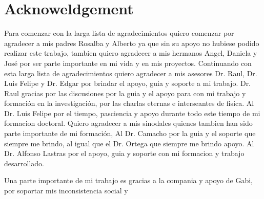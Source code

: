 \chapter*{Acknoweldgement}%

Para comenzar con la larga lista de agradecimientos quiero comenzar por agradecer a mis padres Rosalba y Alberto ya que sin su apoyo no hubiese podido realizar este trabajo, tambien quiero agradecer a mis hermanos Angel, Daniela y Jos\'e por ser parte importante en mi vida y en mis proyectos. Continuando con esta larga lista de agradecimientos quiero agradecer a mis asesores Dr. Raul, Dr. Luis Felipe y Dr. Edgar por brindar el apoyo, guia y soporte a mi trabajo. Dr. Raul gracias por las discusiones por  la guia y el apoyo para con mi trabajo y formaci\'on en la investigaci\'on, por las charlas eternas e interseantes de fisica. Al Dr. Luis Felipe por el tiempo, pasciencia y apoyo durante todo este tiempo de mi formacion doctoral.  Quiero agradecer a mis sinodales quienes tambien han sido parte importante de mi formaci\'on, Al Dr. Camacho por la guia y el soporte que siempre me brindo, al igual que el  Dr. Ortega que siempre me brindo apoyo. Al Dr. Alfonso Lastras por el apoyo, guia y soporte con mi formacion y trabajo desarrollado. 

Una parte importante de mi trabajo es gracias a la compania y apoyo de Gabi, por soportar mis inconsistencia social y 

\cleardoublepage